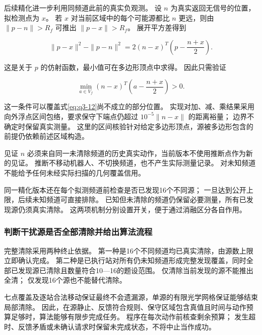 后续精化进一步利用同频道此前的真实负观测。
设 \(n\) 为真实返回无信号的位置，拟检测点为 \(x\)。
若 \(x\) 对当前区域中的每个可能源都比 \(n\) 更远，则由 \(\|p-n\|>R_f\) 可推出 \(\|p-x\|>R_f\)。
展开平方差得到

\begin{equation}\label{eq:q3-13}
\|p-x\|^2-\|p-n\|^2
=2(n-x)^T\left(p-\frac{n+x}{2}\right).
\end{equation}

这是关于 \(p\) 的仿射函数，最小值可在多边形顶点中求得。
因此只需验证

\begin{equation}\label{eq:q3-14}
\min_{a\in V_f}(n-x)^T\left(a-\frac{n+x}{2}\right)>0.
\end{equation}

这一条件可以覆盖式\eqref{eq:q3-12}尚不成立的部分位置。
实现对加、减、乘结果采用向外浮点区间包络，要求保守下端点仍超过 \(10^{-5}\|n-x\|\) 的距离裕量；
边界不确定时保留真实测量。
这里的区间核验针对给定多边形顶点，源被多边形包含的前提仍依赖前述区域构造。

见证 \(n\) 必须来自同一未清除频道的历史真实动作，当前版本不使用推断点作为新的见证。
推断不移动机器人、不切换频道，也不产生实际测量记录。
对未知频道不能给予任何未经实际扫描的几何覆盖信用。

同一精化版本还在每个拟测频道前检查是否已发现16个不同源；
一旦达到公开上限，后续未知频道可直接排除。
已知但未清除的频道仍保留必要测量，所有已发现源仍须真实清除。
这两项机制分别设置开关，便于通过消融区分各自作用。

\subsubsection{判断干扰源是否全部清除并给出算法流程}\label{sec:q3-6}

完整清除采用两种终止依据。
第一种是16个不同频道均已真实清除，由源数上限立即确认完成。
第二种是已执行站对所有仍未知频道形成完整发现覆盖，同时全部已发现源已清除且数量符合10---16的题设范围。
仅清除当前发现的源不能推出全清；
仅发现16个源也不能替代清除。

七点覆盖及逐站合法移动保证最终不会遗漏源，单源的有限光学网格保证能够结束局部清除。
因此，在源静止、反馈符合规则、保守区域包含真值且时间与动作预算足够时，算法能够有限步完成任务。
程序在每次动作前核查剩余预算；
发生超时、反馈矛盾或未确认请求时保留未完成状态，不将中止当作成功。

